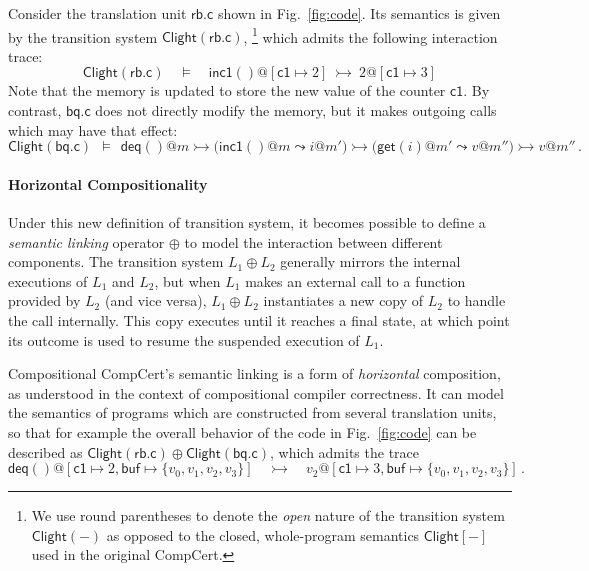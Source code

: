 \documentclass[acmsmall,screen,review,anonymous]{acmart}
\newcommand{\kw}[1]{\ensuremath{ \mathsf{#1} }}
\newcommand{\que}{\circ}
\newcommand{\ans}{\bullet}
\begin{document}

\begin{example} \label{ex:overview:clightsem} %
Consider the translation unit $\kw{rb.c}$ shown in Fig.~\ref{fig:code}.
Its semantics is given by 
the transition system $\kw{Clight}(\kw{rb.c})$,\!%
\footnote{%
  We use round parentheses to denote
  the \emph{open} nature of the transition system $\kw{Clight}(-)$
  as opposed to the closed, whole-program semantics $\kw{Clight}[-]$
  used in the original CompCert.}
which admits the following interaction trace:
\[
  \kw{Clight}(\kw{rb.c}) \quad \vDash \quad
  \kw{inc1}()@[\kw{c1} \mapsto 2]
  \: \rightarrowtail \:
  2@[\kw{c1} \mapsto 3]
\]
Note that the memory is updated to store the new value of the counter $\kw{c1}$.
By contrast, $\kw{bq.c}$
does not directly modify the memory,
but it makes outgoing calls which may have that effect:
\[
  \kw{Clight}(\kw{bq.c}) \:\: \vDash \:\:
  \kw{deq}()@m
  \rightarrowtail
  \big( \kw{inc1}()@m \leadsto i@m' \big)
  \rightarrowtail
  \big( \kw{get}(i)@m' \leadsto v@m'' \big)
  \rightarrowtail
  v@m''
  \,.
\]
\end{example}


\paragraph{Horizontal Compositionality} %

Under this new definition of transition system,
it becomes possible to define a \emph{semantic linking} operator $\oplus$
to model the interaction between different components.
The transition system $L_1 \oplus L_2$
generally mirrors the internal executions of $L_1$ and $L_2$,
but when $L_1$ makes an external call
to a function provided by $L_2$ (and vice versa),
$L_1 \oplus L_2$ instantiates a new copy of $L_2$ to handle the call internally.
This copy executes until it reaches a final state,
at which point its outcome is used to resume
the suspended execution of $L_1$.

Compositional CompCert's semantic linking
is a form of \emph{horizontal} composition,
as understood in the context of compositional compiler correctness.
It can model the semantics of programs
which are constructed from several translation units,
so that for example the overall behavior of the code in Fig.~\ref{fig:code}
can be described as
$
  \kw{Clight}(\kw{rb.c}) \oplus \kw{Clight}(\kw{bq.c})
$,
which admits the trace
\[
  \kw{deq}()@[\kw{c1} \mapsto 2, \kw{buf} \mapsto \{v_0, v_1, v_2, v_3\}]
  \quad\rightarrowtail\quad
  v_2@[\kw{c1} \mapsto 3, \kw{buf} \mapsto \{v_0, v_1, v_2, v_3\}]
  \,.
\]
\end{document}
